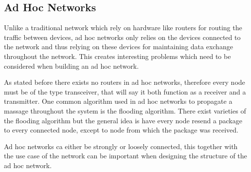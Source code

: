 \subsection{Ad Hoc Networks}
Unlike a traditional network which rely on hardware like routers for routing the traffic between devices, ad hoc networks only relies on the devices connected to the network and thus relying on these devices for maintaining data exchange throughout the network.
This creates interesting problems which need to be considered when building an ad hoc network.

\medskip
As stated before there exists no routers in ad hoc networks, therefore every node must be of the type transceiver, that will say it both function as a receiver and a transmitter.
One common algorithm used in ad hoc networks to propagate a massage  throughout the system is the flooding algorithm.
There exist varieties of the flooding algorithm but the general idea is have every node resend a package to every connected node, except to node from which the package was received.

Ad hoc networks ca either be strongly or loosely connected, this together with the use case of the network can be important when designing the structure of the ad hoc network.
